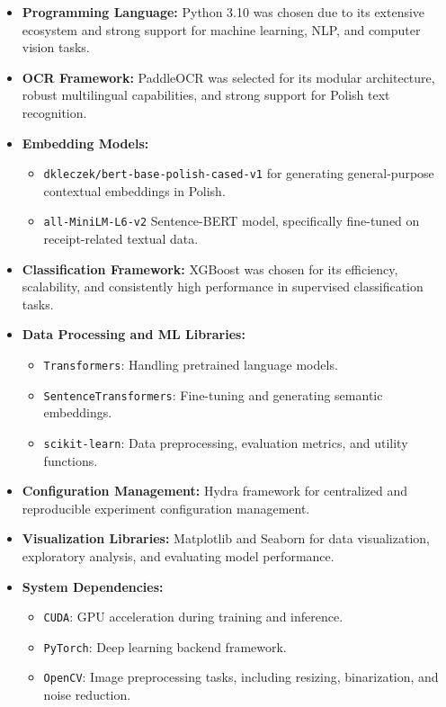 \documentclass{SGGW-thesis-EN}
\begin{document}
\begin{itemize}
    \item \textbf{Programming Language:} Python 3.10 was chosen due to its extensive ecosystem and strong support for machine learning, NLP, and computer vision tasks.

    \item \textbf{OCR Framework:} PaddleOCR was selected for its modular architecture, robust multilingual capabilities, and strong support for Polish text recognition.

    \item \textbf{Embedding Models:}
    \begin{itemize}
        \item \texttt{dkleczek/bert-base-polish-cased-v1} for generating general-purpose contextual embeddings in Polish.
        \item \texttt{all-MiniLM-L6-v2} Sentence-BERT model, specifically fine-tuned on receipt-related textual data.
    \end{itemize}

    \item \textbf{Classification Framework:} XGBoost was chosen for its efficiency, scalability, and consistently high performance in supervised classification tasks.

    \item \textbf{Data Processing and ML Libraries:}
    \begin{itemize}
        \item \texttt{Transformers}: Handling pretrained language models.
        \item \texttt{SentenceTransformers}: Fine-tuning and generating semantic embeddings.
        \item \texttt{scikit-learn}: Data preprocessing, evaluation metrics, and utility functions.
    \end{itemize}

    \item \textbf{Configuration Management:} Hydra framework for centralized and reproducible experiment configuration management.

    \item \textbf{Visualization Libraries:} Matplotlib and Seaborn for data visualization, exploratory analysis, and evaluating model performance.

    \item \textbf{System Dependencies:}
    \begin{itemize}
        \item \texttt{CUDA}: GPU acceleration during training and inference.
        \item \texttt{PyTorch}: Deep learning backend framework.
        \item \texttt{OpenCV}: Image preprocessing tasks, including resizing, binarization, and noise reduction.
    \end{itemize}
\end{itemize}
\end{document}
